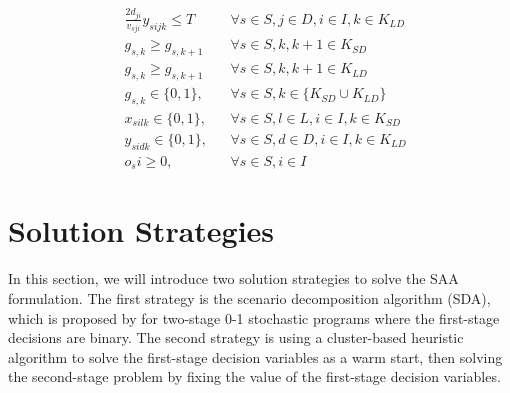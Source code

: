 \documentclass[preprint,review,11pt,authoryear]{elsarticle}
\begin{document}
\begin{subequations}
\begin{align}
                        & \frac{2d_{ji}}{v_{sji}} y_{sijk} \leq T && \forall s \in S , j \in D, i \in I, k \in K_{LD} \label{constraint:DepotTimeLimitLD_SAA} \\
                        & g_{s,k} \geq g_{s,k+1} && \forall s \in S , k, k+1 \in K_{SD} \label{constraint:SD_Remove_Symmetry_SAA} \\
                        & g_{s,k} \geq g_{s,k+1} && \forall s \in S , k, k+1 \in K_{LD} \label{constraint:LD_Remove_Symmetry_SAA} \\
                         & g_{s,k} \in \{0,1\}, && \forall s \in S , k \in \{K_{SD} \cup K_{LD}\} \label{constraint:gBinary_SAA} \\
                         & x_{silk} \in \{0,1\}, && \forall s \in S , l \in L, i \in I, k \in K_{SD} \label{constraint:xBinary_SAA} \\
                         & y_{sidk} \in \{0,1\}, && \forall s \in S , d \in D, i \in I, k \in K_{LD} \label{constraint:yBinary_SAA} \\
                         & o_si \geq 0, && \forall  s \in S , i \in I \label{constraint:Unmet}
    \end{align}
\end{subequations}
\normalsize

\section{Solution Strategies}\label{sec:methods}
In this section, we will introduce two solution strategies to solve the SAA formulation. The first strategy is the scenario decomposition algorithm (SDA), which is proposed by \cite{ahmed2013SDA} for two-stage 0-1 stochastic programs where the first-stage decisions are binary. The second strategy is using a cluster-based heuristic algorithm to solve the first-stage decision variables as a warm start, then solving the second-stage problem by fixing the value of the first-stage decision variables. 
\end{document}
